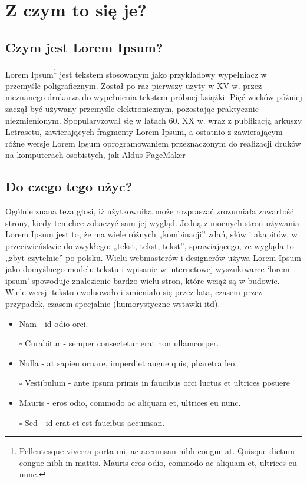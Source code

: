 \documentclass[a4paper,12pt]{article}
\begin{document}
\section{Z czym to się je?}

\subsection{Czym jest Lorem Ipsum?}

Lorem Ipsum\footnote{Pellentesque viverra porta mi, ac accumsan nibh congue at. Quisque dictum congue nibh in mattis. Mauris eros odio, commodo ac aliquam et, ultrices eu nunc.} jest tekstem stosowanym jako przykładowy wypełniacz w przemyśle poligraficznym. Został po raz pierwszy użyty w XV w. przez nieznanego drukarza do wypełnienia tekstem próbnej książki. Pięć wieków później zaczął być używany przemyśle elektronicznym, pozostając praktycznie niezmienionym. Spopularyzował się w latach 60. XX w. wraz z publikacją arkuszy Letrasetu, zawierających fragmenty Lorem Ipsum, a ostatnio z zawierającym różne wersje Lorem Ipsum oprogramowaniem przeznaczonym do realizacji druków na komputerach osobistych, jak Aldus PageMaker

\subsection{Do czego tego użyc?}

Ogólnie znana teza głosi, iż użytkownika może rozpraszać zrozumiała zawartość strony, kiedy ten chce zobaczyć sam jej wygląd. Jedną z mocnych stron używania Lorem Ipsum jest to, że ma wiele różnych „kombinacji” zdań, słów i akapitów, w przeciwieństwie do zwykłego: „tekst, tekst, tekst”, sprawiającego, że wygląda to „zbyt czytelnie” po polsku. Wielu webmasterów i designerów używa Lorem Ipsum jako domyślnego modelu tekstu i wpisanie w internetowej wyszukiwarce ‘lorem ipsum’ spowoduje znalezienie bardzo wielu stron, które wciąż są w budowie. Wiele wersji tekstu ewoluowało i zmieniało się przez lata, czasem przez przypadek, czasem specjalnie (humorystyczne wstawki itd).

\begin{itemize}
\item Nam - id odio orci.
\item[$\square$] Curabitur  - semper consectetur erat non ullamcorper.
\item Nulla - at sapien ornare, imperdiet augue quis, pharetra leo.
\item[$\square$] Vestibulum - ante ipsum primis in faucibus orci luctus et ultrices posuere
\item Mauris - eros odio, commodo ac aliquam et, ultrices eu nunc. 
\item[$\square$] Sed - id erat et est faucibus accumsan.

\end{itemize}
\end{document}
